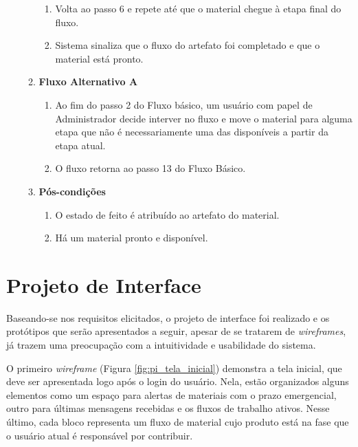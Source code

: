 \begin{enumerate}[label=\textbf{UC03}, leftmargin=2cm]
\begin{enumerate}[label=, leftmargin=0cm]
\begin{enumerate}[label=\arabic*.]
				\item Volta ao passo 6 e repete até que o material chegue à etapa final do fluxo.
				\item Sistema sinaliza que o fluxo do artefato foi completado e que o material está pronto.
			\end{enumerate}
		\item \textbf{Fluxo Alternativo A}
			\begin{enumerate}[label=\arabic*.]
				\item Ao fim do passo 2 do Fluxo básico, um usuário com papel de Administrador decide interver no fluxo e move o material para alguma etapa que não é necessariamente uma das disponíveis a partir da etapa atual.
				\item O fluxo retorna ao passo 13 do Fluxo Básico.
			\end{enumerate}
		\item \textbf{Pós-condições}
			\begin{enumerate}[label=\arabic*.]
				\item O estado de feito é atribuído ao artefato do material.
				\item Há um material pronto e disponível.
			\end{enumerate}
	\end{enumerate}
	 
\end{enumerate}


\section{Projeto de Interface}

Baseando-se nos requisitos elicitados, o projeto de interface foi realizado e os protótipos que serão apresentados a seguir, apesar de se tratarem de \textit{wireframes}, já trazem uma preocupação com a intuitividade e usabilidade do sistema.

O primeiro \textit{wireframe} (Figura \hyperref[fig:pi_tela_inicial]{\ref{fig:pi_tela_inicial}}) demonstra a tela inicial, que deve ser apresentada logo após o login do usuário. Nela, estão organizados alguns elementos como um espaço para alertas de materiais com o prazo emergencial, outro para últimas mensagens recebidas e os fluxos de trabalho ativos. Nesse último, cada bloco representa um fluxo de material cujo produto está na fase que o usuário atual é responsável por contribuir.

